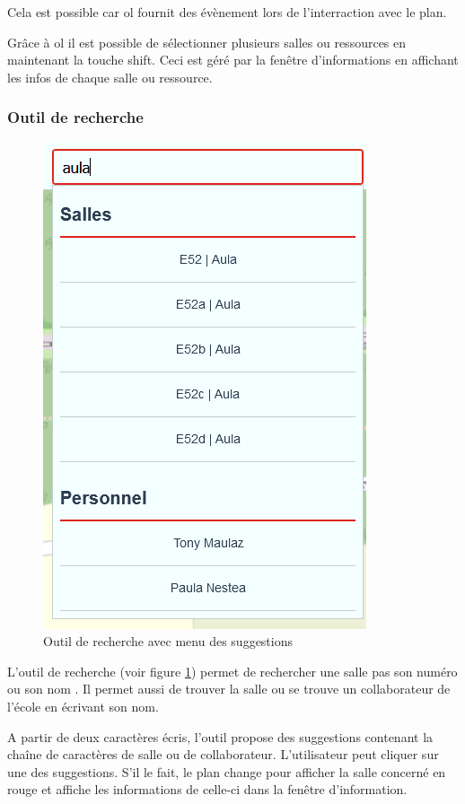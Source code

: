 \documentclass[
    iai, %
    il, %
]{heig-tb}
\begin{document}
Cela est possible car \gls{ol} fournit des évènement lors de l'interraction avec le plan.

Grâce à \gls{ol} il est possible de sélectionner plusieurs salles ou ressources en maintenant la touche shift.
Ceci est géré par la fenêtre d'informations en affichant les infos de chaque salle ou ressource.

\subsubsection{Outil de recherche}

\begin{figure}[h]
    \centering
    \includegraphics[scale=0.5]{frontend-recherche.png}
    \caption{Outil de recherche avec menu des suggestions}
    \label{fig:recherche}
\end{figure}


L'outil de recherche (voir figure \ref{fig:recherche}) permet de rechercher une salle pas son numéro ou son nom .
Il permet aussi de trouver la salle ou se trouve un collaborateur de l'école en écrivant son nom.

A partir de deux caractères écris, l'outil propose des suggestions contenant la chaîne de caractères de salle ou de collaborateur.
L'utilisateur peut cliquer sur une des suggestions.
S'il le fait, le plan change pour afficher la salle concerné en rouge et affiche les informations de celle-ci dans la fenêtre d'information.
\end{document}
